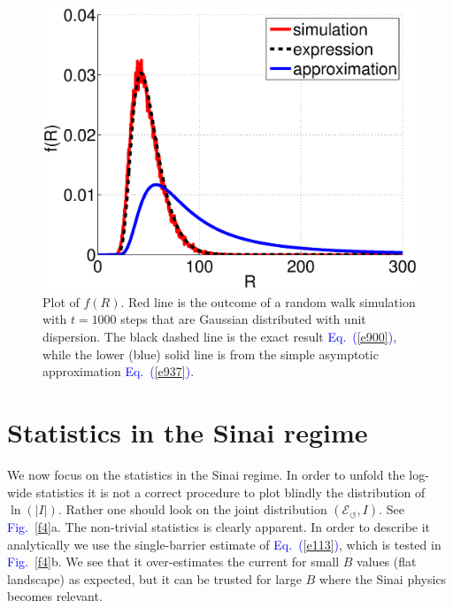 \documentclass[aps,pre,floats,floatfix,twocolumn]{revtex4}
\newcommand{\Eq}[1]{\textcolor{blue}{Eq.\!\!~(\ref{#1})}}
\newcommand{\Fig}[1]{\textcolor{blue}{Fig.}\!\!~\ref{#1}}
\begin{document}
\begin{figure}

\includegraphics[width=\hsize]{PB_sim.eps}

\caption{
Plot of $f(R)$. Red line is the outcome of a random walk simulation with ${t=1000}$ 
steps that are Gaussian distributed with unit dispersion.   
The black dashed line is the exact result \Eq{e900}, 
while the lower (blue) solid line is from the simple asymptotic approximation \Eq{e937}.} 

\label{fb}
\end{figure}






\section{Statistics in the Sinai regime}
\label{sec:in}

We now focus on the statistics in the Sinai regime. 
In order to unfold the log-wide statistics it is 
not a correct procedure to plot blindly the distribution 
of $\ln(|I|)$. Rather one should look on the joint 
distribution ${(\mathcal{E}_{\circlearrowleft},I)}$. 
See \Fig{f4}a. The non-trivial statistics is clearly apparent.
In order to describe it analytically we use 
the single-barrier estimate of \Eq{e113}, 
which is tested in \Fig{f4}b. We see that it 
over-estimates the current for small $B$ values 
(flat landscape) as expected, but it can be trusted 
for large $B$ where the Sinai physics becomes relevant. 
\end{document}

